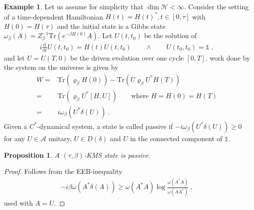 \documentclass[
a4paper, %
11pt, %
onecolumn, %
openany, %
]{memoir}
\theoremstyle{definition}
\newtheorem{example}[definition]{Example}
\theoremstyle{remark}
\theoremstyle{plain}
\newtheorem{prop}[definition]{Proposition}
\begin{document}
\begin{example}
Let us assume for simplicity that $\dim \mathcal{H}<\infty$. Consider the setting of a time-dependent Hamiltonian $H(t)=H(t)^*, t\in[0,\tau]$ with $H(0)=H(\tau)$ and the initial state is a Gibbs state $\omega_{\beta}(A)=Z_{\beta}^{-1}\mathrm{Tr}(e^{-\beta H(0)}A)$. Let $U(t,t_0)$ be the solution of \begin{align}
i\frac{\mathrm{d}}{\mathrm{d}t}U(t,t_0)=H(t)U(t,t_0) \qquad \land \qquad U(t_0,t_0)=\mathds{1}\; ,
\end{align}
and let $U=U(T,0)$ be the driven evolution over one cycle $[0,T]$. work done by the system on the universe is given by \begin{align}
W=&\mathrm{Tr}(\varrho_{\beta}H(0))-\mathrm{Tr}(U\varrho_{\beta}U^*H(T))\\
=& \mathrm{Tr}(\varrho_{\beta}U^*[H,U]) \qquad \text{where }H=H(0)=H(T)\\
=& i\omega_{\beta}(U^*\delta(U))\; .
\end{align}
Given a $C^*$-dynamical system, a state is called passive if $-i\omega_{\beta}(U^*\delta(U))\geq 0$ for any $U\in\mathcal{A}$ unitary, $U\in D(\delta)$ and $U$ in the connected component of $\mathds{1}$.\end{example}
\begin{prop}
A $(\tau,\beta)$-KMS state is passive.
\end{prop}
\begin{proof}
Follows from the EEB-inequality \begin{align}
-i\beta\omega(A^*\delta(A))\geq \omega(A^*A)\log\frac{\omega(A^*A)}{\omega(AA^*)}\; ,
\end{align}
used with $A=U$.\end{proof}
\end{document}

